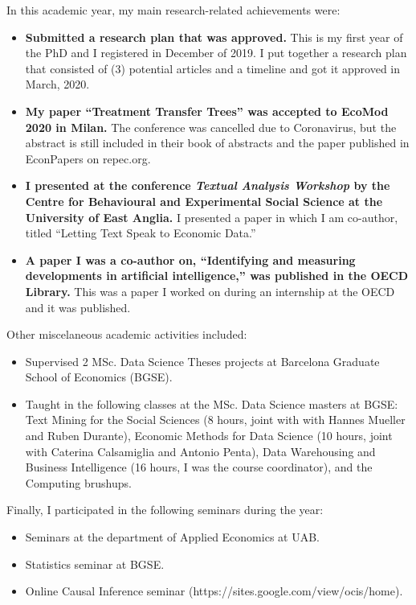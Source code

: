 \documentclass[a4paper,12pt]{article}
\begin{document}
In this academic year, my main research-related achievements were:

\begin{itemize}
\item \textbf{Submitted a research plan that was approved.} This is my first year of the PhD and I registered in December of 2019. I put together a research plan that consisted of (3) potential articles and a timeline and got it approved in March, 2020.

\item \textbf{My paper ``Treatment Transfer Trees'' was accepted to EcoMod 2020 in Milan.} The conference was cancelled due to Coronavirus, but the abstract is still included in their book of abstracts and the paper published in EconPapers on repec.org.

\item \textbf{I presented at the conference \textit{Textual Analysis Workshop} by the Centre for Behavioural and Experimental Social Science at the University of East Anglia.} I presented a paper in which I am co-author, titled ``Letting Text Speak to Economic Data.'' 

\item \textbf{A paper I was a co-author on, ``Identifying and measuring developments in artificial intelligence,'' was published in the OECD Library.} This was a paper I worked on during an internship at the OECD and it was published.
\end{itemize}

Other miscelaneous academic activities included: 

\begin{itemize}
\item Supervised 2 MSc. Data Science Theses projects at Barcelona Graduate School of Economics (BGSE).
\item Taught in the following classes at the MSc. Data Science masters at BGSE: Text Mining for the Social Sciences (8 hours, joint with with Hannes Mueller and Ruben Durante), Economic Methods for Data Science (10 hours, joint with Caterina Calsamiglia and Antonio Penta), Data Warehousing and Business Intelligence (16 hours, I was the course coordinator), and the Computing brushups. 
\end{itemize}

Finally, I participated in the following seminars during the year: 

\begin{itemize}
\item Seminars at the department of Applied Economics at UAB.
\item Statistics seminar at BGSE.
\item Online Causal Inference seminar (https://sites.google.com/view/ocis/home).
\end{itemize}
\end{document}
